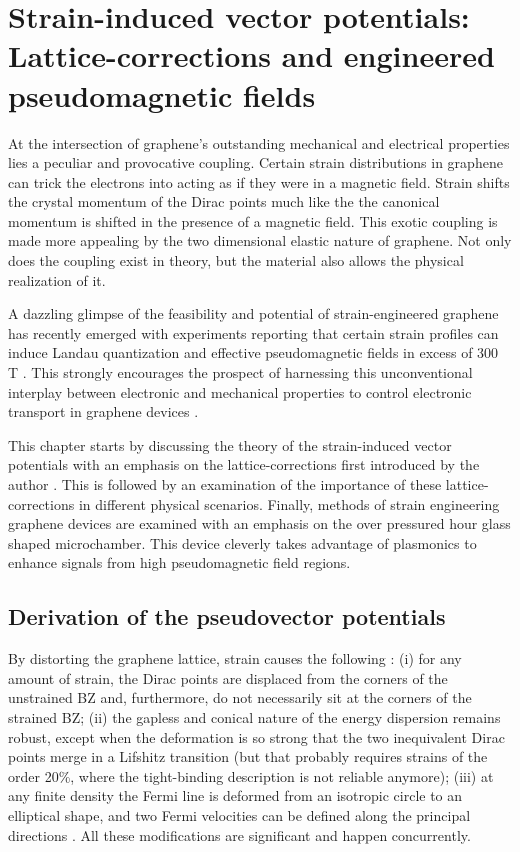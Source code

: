 \chapter{Strain-induced vector potentials: Lattice-corrections and engineered pseudomagnetic fields\label{chap:PVP}}

At the intersection of graphene's outstanding mechanical and electrical properties lies a peculiar and provocative coupling.
Certain strain distributions in graphene can trick the electrons into acting as if they were in a magnetic field.
Strain shifts the crystal momentum of the Dirac points much like the the canonical momentum is shifted in the presence of a magnetic field.
This exotic coupling is made more appealing by the two dimensional elastic nature of graphene.
Not only does the coupling exist in theory, but the material also allows the physical realization of it.

A dazzling glimpse of the feasibility and potential of strain-engineered graphene \cite{Pereira2009a,Guinea2009} has recently emerged with experiments reporting that certain strain profiles can induce Landau quantization and effective pseudomagnetic fields in excess of 300 T \cite{Levy2010,Yan2012,Yeh2011}.
This strongly encourages the prospect of harnessing this unconventional interplay between electronic and mechanical properties to control electronic transport in graphene devices \cite{Pereira2009a,Fogler2008}.

This chapter starts by discussing the theory of the strain-induced vector potentials with an emphasis on the lattice-corrections first introduced by the author \cite{Kitt2012,Kitt2013}.
This is followed by an examination of the importance of these lattice-corrections in different physical scenarios.
Finally, methods of strain engineering graphene devices are examined with an emphasis on the over pressured hour glass shaped microchamber.
This device cleverly takes advantage of plasmonics to enhance signals from high pseudomagnetic field regions.

\section{Derivation of the pseudovector potentials}

By distorting the graphene lattice, strain causes the following \cite{Pereira2009}:
(i) for any amount of strain, the Dirac points are displaced from the corners of the unstrained BZ and, furthermore, do not necessarily sit at the corners of the strained BZ;
(ii) the gapless and conical nature of the energy dispersion remains robust, except when the deformation is so strong that the two inequivalent Dirac points merge in a Lifshitz transition (but that probably requires strains of the order 20\%, where the tight-binding description is not reliable anymore);
(iii) at any finite density the Fermi line is deformed from an isotropic circle to an elliptical shape, and two Fermi velocities can be defined along the principal directions \cite{Pereira2009,Pereira2010c,Choi2010}.
All these modifications are significant and happen concurrently. 

